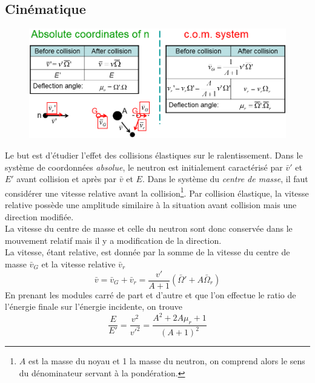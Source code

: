 \subsection{Cinématique}
	\begin{figure}
	\vspace{-5mm}
	\includegraphics[scale=0.4]{ch7/image1.png}
	\end{figure}
	Le but est d'étudier l'effet des collisions élastiques sur le ralentissement. Dans le système de 
	coordonnées \textit{absolue}, le neutron est initialement caractérisé par $\bar v'$ et $E'$ avant 
	collision et après par $\bar v$ et $E$. Dans le système du \textit{centre de masse}, il faut 
	considérer une vitesse relative avant la collision\footnote{$A$ est la masse du noyau et 1 la
	masse du neutron, on comprend alors le sens du dénominateur servant à la pondération.}. Par 
	collision élastique, la vitesse relative possède une amplitude similaire à la situation avant 
	collision mais une direction modifiée. \\
	
	La vitesse du centre de masse et celle du neutron sont donc conservée dans le mouvement relatif
	mais il y a modification de la direction.\\
	
	La vitesse, étant relative, est donnée par la somme de la vitesse du centre de masse $\bar v_G$ et 
	la vitesse relative $\bar v_r$
	\begin{equation}
	\bar v = {\bar v_G} + {\bar v_r} = \frac{{v'}}{{A + 1}}(\bar \Omega ' + A{\bar \Omega _r})
	\end{equation}
	En prenant les modules carré de part et d'autre et que l'on effectue le ratio de l'énergie 
	finale sur l'énergie incidente, on trouve
	\begin{equation}
	\frac{E}{{E'}} = \frac{{{v^2}}}{{v{'^2}}} = \frac{{{A^2} + 2A{\mu _r} + 1}}{{{{(A + 1)}^2}}}
	\end{equation}
	
